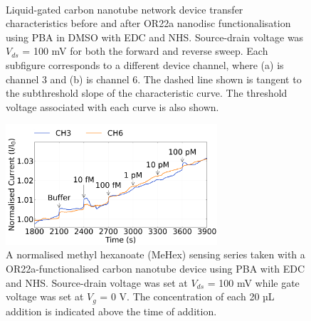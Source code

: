 \documentclass[
  a4paper,
]{scrbook}
\begin{document}
\begin{figure}
\begin{minipage}[t]{0.45\linewidth}
{{}

}

\end{minipage}%
%
\begin{minipage}[t]{0.01\linewidth}

{\centering 

~

}

\end{minipage}%

\caption{\label{fig-EDCNHS-TX}Liquid-gated carbon nanotube network
device transfer characteristics before and after OR22a nanodisc
functionalisation using PBA in DMSO with EDC and NHS. Source-drain
voltage was \(V_{ds}\) = 100 mV for both the forward and reverse sweep.
Each subfigure corresponds to a different device channel, where (a) is
channel 3 and (b) is channel 6. The dashed line shown is tangent to the
subthreshold slope of the characteristic curve. The threshold voltage
associated with each curve is also shown.}

\end{figure}

\begin{figure}

{\centering \includegraphics[width=0.7\textwidth,height=\textheight]{figures/ch8/NTQ25D3_OR22a_sample_220218_EDCNHS.png}

}

\caption{\label{fig-EDCNHS-sensing}A normalised methyl hexanoate (MeHex)
sensing series taken with a OR22a-functionalised carbon nanotube device
using PBA with EDC and NHS. Source-drain voltage was set at \(V_{ds}\) =
100 mV while gate voltage was set at \(V_g\) = 0 V. The concentration of
each 20 µL addition is indicated above the time of addition.}

\end{figure}
\end{document}
